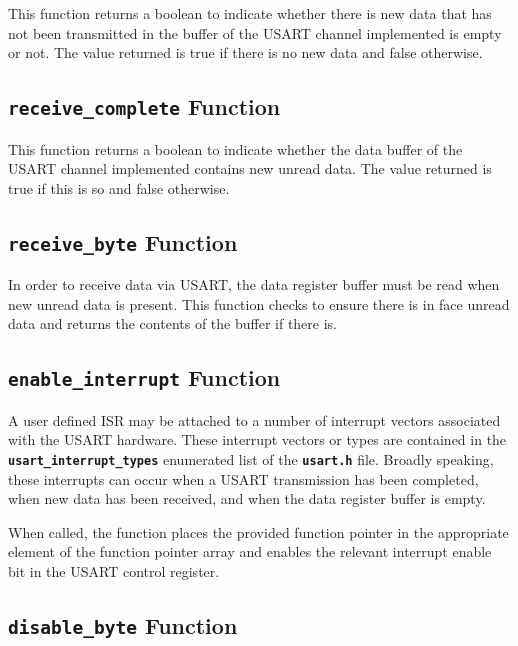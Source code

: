\documentclass[a4paper, oneside, 11pt, titlepage, onecolumn, openright]{report}
\begin{document}
{{			This function returns a boolean to indicate whether there is new data that has not been transmitted in the buffer of the USART channel implemented is empty or not. The value returned is true if there is no new data and false otherwise.
			
\subsection{\textbf{\texttt{receive\_complete}} Function}
			\label{ss:HALusartreceive_completeFunction}
			
			This function returns a boolean to indicate whether the data buffer of the USART channel implemented contains new unread data. The value returned is true if this is so and false otherwise.
			
\subsection{\textbf{\texttt{receive\_byte}} Function}
			\label{ss:HALusartreceive_byteFunction}
			
			In order to receive data via USART, the data register buffer must be read when new unread data is present. This function checks to ensure there is in face unread data and returns the contents of the buffer if there is.
			
\subsection{\textbf{\texttt{enable\_interrupt}} Function}
			\label{ss:HALusartenable_interruptFunction}	
			
			A user defined ISR may be attached to a number of interrupt vectors associated with the USART hardware. These interrupt vectors or types are contained in the \textbf{\texttt{usart\_interrupt\_types}} enumerated list of the \textbf{\texttt{usart.h}} file.	Broadly speaking, these interrupts can occur when a USART transmission has been completed, when new data has been received, and when the data register buffer is empty.
			
			When called, the function places the provided function pointer in the appropriate element of the function pointer array and enables the relevant interrupt enable bit in the USART control register.
			
\subsection{\textbf{\texttt{disable\_byte}} Function}
			\label{ss:HALusartdisable_byteFunction}
			
}}
\end{document}
